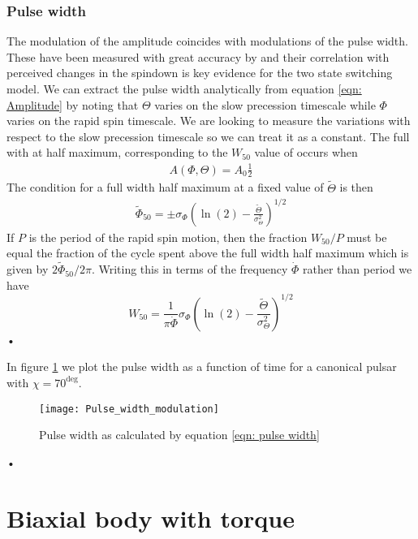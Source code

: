 \documentclass[/home/greg/Thesis/main/main.tex]{subfiles}
\begin{document}
\subsubsection{Pulse width}
The modulation of the amplitude coincides with modulations of the pulse width.
These have been measured with great accuracy by \citet{Lyne2010} and their
correlation with perceived changes in the spindown is key evidence for the two
state switching model. We can extract the pulse width analytically from
equation \eqref{eqn: Amplitude} by noting that $\Theta$ varies on the slow
precession timescale while $\Phi$ varies on the rapid spin timescale. We are
looking to measure the variations with respect to the slow precession timescale
so we can treat it as a constant. The full with at half maximum, corresponding
to the $W_{50}$ value of \citet{Lyne2010} occurs when
\begin{align}
A(\Phi, \Theta) = A_{0} \frac{1}{2} 
\end{align}
The condition for a full width half maximum at a fixed value of $\tilde{\Theta}$ 
is then
\begin{align}
\tilde{\Phi}_{50} = \pm\sigma_{\Phi}\left(\ln(2) 
          - \frac{\tilde{\Theta}}{\sigma_{\Theta}^{2}}\right)^{1/2}
\end{align}
If $P$ is the period of the rapid spin motion, then the fraction $W_{50}/P$
must be equal the fraction of the cycle spent above the full width half maximum
which is given by $2\tilde{\Phi}_{50} / 2\pi$. Writing this in terms of the
frequency $\dot{\Phi}$ rather than period we have
\begin{equation}
W_{50} = \frac{1}{\pi\dot\Phi}\sigma_{\Phi}\left(\ln(2) 
     - \frac{\tilde{\Theta}}{\sigma_{\Theta}^{2}}\right)^{1/2}
\label{eqn: pulse width}
\end{equation}•

In figure \ref{fig: PulseWidthModulation} we plot the pulse width as a function
of time for a canonical pulsar with $\chi=70^{\deg}$. 
\begin{figure}[ht]
\centering
\texttt{[image: Pulse\_width\_modulation]}
\caption{Pulse width as calculated by equation \eqref{eqn: pulse width} }
\label{fig: PulseWidthModulation}
\end{figure}•

\FloatBarrier


\section{Biaxial body with torque}
\end{document}

